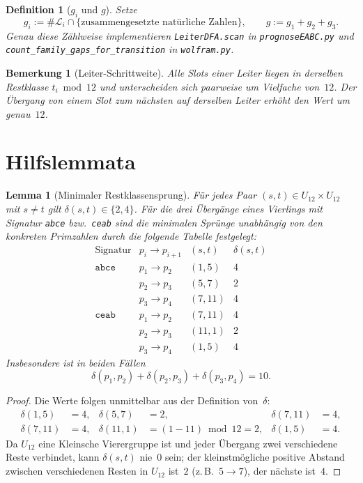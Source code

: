 \documentclass[11pt,a4paper]{article}
\newtheorem{lemma}[theorem]{Lemma}
\newtheorem{definition}{Definition}
\newtheorem{remark}{Bemerkung}
\begin{document}
\begin{definition}[$g_i$ und $g$]
Setze
\[
  g_i := \#\mathcal{L}_i \cap \{\text{zusammengesetzte natürliche Zahlen}\},
  \qquad
  g := g_1 + g_2 + g_3.
\]
Genau diese Zählweise implementieren \texttt{LeiterDFA.scan} in
\texttt{prognoseEABC.py} und \texttt{count\_family\_gaps\_for\_transition} in
\texttt{wolfram.py}.
\end{definition}

\begin{remark}[Leiter-Schrittweite]
Alle Slots einer Leiter liegen in derselben Restklasse $t_i \bmod 12$ und
unterscheiden sich paarweise um Vielfache von~$12$.
Der Übergang von einem Slot zum nächsten auf derselben Leiter erhöht den
Wert um genau~$12$.
\end{remark}

\section{Hilfslemmata}

\begin{lemma}[Minimaler Restklassensprung]
\label{lem:delta-table}
Für jedes Paar $(s,t) \in U_{12}\times U_{12}$ mit $s \neq t$ gilt
$\delta(s,t) \in \{2,4\}$.
Für die drei Übergänge eines Vierlings mit Signatur \texttt{abce} bzw.\
\texttt{ceab} sind die minimalen Sprünge unabhängig von den konkreten Primzahlen
durch die folgende Tabelle festgelegt:
\[
\begin{array}{c|ccc}
  \text{Signatur} & p_i \to p_{i+1} & (s,t) & \delta(s,t)\\\hline
  \texttt{abce} & p_1 \to p_2 & (1,5)  & 4\\
                & p_2 \to p_3 & (5,7)  & 2\\
                & p_3 \to p_4 & (7,11) & 4\\[4pt]
  \texttt{ceab} & p_1 \to p_2 & (7,11) & 4\\
                & p_2 \to p_3 & (11,1) & 2\\
                & p_3 \to p_4 & (1,5)  & 4
\end{array}
\]
Insbesondere ist in beiden Fällen
\[
  \delta(p_1,p_2) + \delta(p_2,p_3) + \delta(p_3,p_4) = 10.
\]
\end{lemma}

\begin{proof}
Die Werte folgen unmittelbar aus der Definition von~$\delta$:
\begin{align*}
  \delta(1,5)  &= 4, &
  \delta(5,7)  &= 2, &
  \delta(7,11) &= 4,\\
  \delta(7,11) &= 4, &
  \delta(11,1) &= (1-11)\bmod 12 = 2, &
  \delta(1,5)  &= 4.
\end{align*}
Da $U_{12}$ eine Kleinsche Vierergruppe ist und jeder Übergang zwei
verschiedene Reste verbindet, kann $\delta(s,t)$ nie~$0$ sein; der kleinstmögliche
positive Abstand zwischen verschiedenen Resten in $U_{12}$ ist~$2$
(z.\,B.\ $5 \to 7$), der nächste ist~$4$.
\end{proof}
\end{document}
